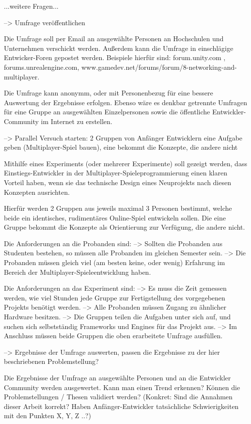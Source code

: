 ...weitere Fragen...

	--> Umfrage veröffentlichen
	
Die Umfrage soll per Email an ausgewählte Personen an Hochschulen und Unternehmen verschickt werden. Außerdem kann die Umfrage in einschlägige Entwicker-Foren gepostet werden. Beispiele hierfür sind: forum.unity.com , forums.unrealengine.com, www.gamedev.net/forums/forum/8-networking-and-multiplayer.

Die Umfrage kann anonymm, oder mit Personenbezug für eine bessere Auswertung der Ergebnisse erfolgen. Ebenso wäre es denkbar getrennte Umfragen für eine Gruppe an ausgewählten Einzelpersonen sowie die öffentliche Entwickler-Community im Internet zu erstellen.
	
	--> Parallel Versuch starten: 2 Gruppen von Anfänger Entwicklern eine Aufgabe geben (Multiplayer-Spiel bauen), eine bekommt die Konzepte, die andere nicht
	
Mithilfe eines Experiments (oder mehrerer Experimente) soll gezeigt werden, dass Einstiegs-Entwickler in der Multiplayer-Spieleprogrammierung einen klaren Vorteil haben, wenn sie das technische Design eines Neuprojekts nach diesen Konzepten ausrichten.

Hierfür werden 2 Gruppen aus jeweils maximal 3 Personen bestimmt, welche beide ein identisches, rudimentäres Online-Spiel entwickeln sollen. Die eine Gruppe bekommt die Konzepte als Orientierung zur Verfügung, die andere nicht.

Die Anforderungen an die Probanden sind:
--> Sollten die Probanden aus Studenten bestehen, so müssen alle Probanden im gleichen Semester sein.
--> Die Probanden müssen gleich viel (am besten keine, oder wenig) Erfahrung im Bereich der Multiplayer-Spieleentwicklung haben.

Die Anforderungen an das Experiment sind:
--> Es muss die Zeit gemessen werden, wie viel Stunden jede Gruppe zur Fertigstellung des vorgegebenen Projekts benötigt werden.
--> Alle Probanden müssen Zugang zu ähnlicher Hardware besitzen.
--> Die Gruppen teilen die Aufgaben unter sich auf, und suchen sich selbstständig Frameworks und Engines für das Projekt aus.
--> Im Anschluss müssen beide Gruppen die oben erarbeitete Umfrage ausfüllen.


	--> Ergebnisse der Umfrage auswerten, passen die Ergebnisse zu der hier beschriebenen Problemstellung?

Die Ergebnisse der Umfrage an ausgewählte Personen und an die Entwickler Community werden ausgewertet. Kann man einen Trend erkennen? Können die Problemstellungen / Thesen validiert werden? 
(Konkret: Sind die Annahmen dieser Arbeit korrekt? Haben Anfänger-Entwickler tatsächliche Schwierigkeiten mit den Punkten X, Y, Z ..?)

